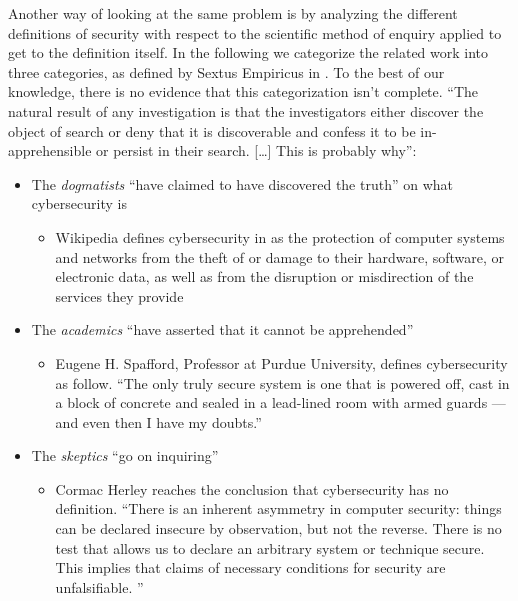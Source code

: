 Another way of looking at the same problem is by analyzing the different
definitions of security with respect to the scientific method of enquiry
applied to get to the definition itself. In the following we categorize the
related work into three categories, as defined by Sextus Empiricus in
\autocite{Empiricus1990Pyrrhonism}.  To the best of our knowledge, there is no
evidence that this categorization isn't complete.  ``The natural result of any
investigation is that the investigators either discover the object of search or
deny that it is discoverable and confess it to be in-apprehensible or persist
in their search. [\ldots] This is probably
why''\autocite{Empiricus1990Pyrrhonism}: 
\begin{itemize}
	\item The \emph{dogmatists} ``have claimed to have discovered the truth'' on what cybersecurity is
		\begin{itemize}
			\item Wikipedia defines cybersecurity in
				\autocite{wiki-cybersecurity} as the protection
				of computer systems and networks from the theft
				of or damage to their hardware, software, or
				electronic data, as well as from the disruption
				or misdirection of the services they provide
		\end{itemize}
	\item The \emph{academics} ``have asserted that it cannot be apprehended''
		\begin{itemize}
			\item Eugene H. Spafford, Professor at Purdue
				University, defines cybersecurity as follow.
				``The only truly secure system is one that is
				powered off, cast in a block of concrete and
				sealed in a lead-lined room with armed guards —
				and even then I have my doubts.''
				\autocite{Spafford2019Quotes}
		\end{itemize}
	\item The \emph{skeptics} ``go on inquiring''
		\begin{itemize}
			\item Cormac Herley reaches the conclusion that
				cybersecurity has no definition. ``There is an
				inherent asymmetry in computer security: things
				can be declared insecure by observation, but
				not the reverse. There is no test that allows
				us to declare an arbitrary system or technique
				secure. This implies that claims of necessary
				conditions for security are unfalsifiable. ''
				\autocite{Herley2016unfalsifiability}
		\end{itemize}
\end{itemize}

